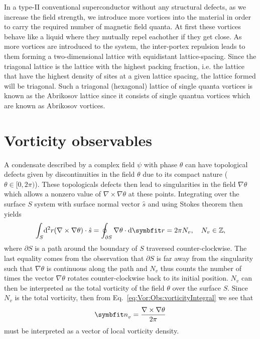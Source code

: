 In a type-II conventional superconductor without any structural defects, as we increase the field strength, we introduce more vortices into the material
in order to carry the required number of magnetic field quanta. At first these vortices behave like a liquid where they mutually repel eachother if they 
get close. As more vortices are introduced to the system, the inter-portex repulsion leads to them forming a two-dimensional lattice with equidistant lattice-spacing.
Since the triagonal lattice is the lattice with the highest packing fraction, i.e. the lattice that have the highest density of sites at a given lattice spacing,
the lattice formed will be triagonal. Such a triagonal (hexagonal) lattice of single quanta vortices is known as the Abrikosov lattice since it consists
of single quantua vortices which are known as Abrikosov vortices.

\section{Vorticity observables}


A condensate described by a complex field $\psi$ with phase $\theta$ can have topological defects given by discontinuities in the field $\theta$ due to its compact
nature ($\theta\in[0,2\pi)$). These topologicals
defects then lead to singularities in the field $\nabla\theta$ which allows a nonzero value of $\nabla\times\nabla\theta$ at these points. Integrating over the surface
$S$ system with surface normal vector $\hat{s}$ and using Stokes theorem then yields
\begin{equation}
    \label{eq:Vor:Obs:vorticityIntegral}
    \int_S\!\mathrm{d}^2r (\nabla\times\nabla\theta)\cdot\hat{s} = \oint_{\partial S}\nabla\theta\cdot\mathrm{d}\v{r} = 2\pi N_v,\quad N_v\in\mathbb{Z},
\end{equation}
where $\partial S$ is a path around the boundary of $S$ traversed counter-clockwise. The last equality comes from the observation that
$\partial S$ is far away from the singularity such that $\nabla\theta$ is continuous along the path and $N_v$ thus counts the number of times the vector $\nabla\theta$
rotates counter-clockwise back to its initial position. $N_v$ can then be interpreted as the total vorticity of the field $\theta$ over the surface $S$.
Since $N_v$ is the total vorticity, then from Eq.~\eqref{eq:Vor:Obs:vorticityIntegral} we see that
\begin{equation}
    \label{eq:Vor:Obs:localVorticity}
    \v{n}_v = \frac{\nabla\times\nabla\theta}{2\pi} 
\end{equation}
must be interpreted as a vector of local vorticity density.

